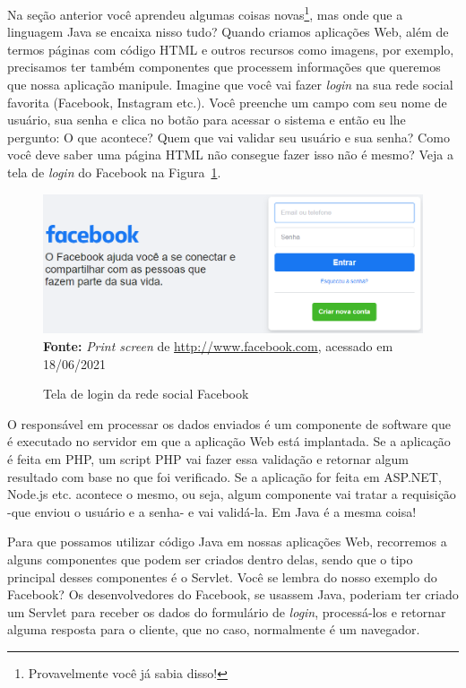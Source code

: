 Na seção anterior você aprendeu algumas coisas novas\footnote{Provavelmente você já sabia disso!}, mas onde que a linguagem Java se encaixa nisso tudo? Quando criamos aplicações Web, além de termos páginas com código HTML e outros recursos como imagens, por exemplo, precisamos ter também componentes que processem informações que queremos que nossa aplicação manipule. Imagine que você vai fazer \textit{login} na sua rede social favorita (Facebook, Instagram etc.). Você preenche um campo com seu nome de usuário, sua senha e clica no botão para acessar o sistema e então eu lhe pergunto: O que acontece? Quem que vai validar seu usuário e sua senha? Como você deve saber uma página HTML não consegue fazer isso não é mesmo? Veja a tela de \textit{login} do Facebook na Figura~\ref{fig:cap01LoginFacebook}.

\FloatBarrier
\begin{figure}[!htbp]
    \centering
    \caption{Tela de login da rede social Facebook}
    \includegraphics[scale=0.38]{imagens/cap01LoginFacebook}
    \\\textbf{Fonte:} \textit{Print screen} de \url{http://www.facebook.com}, acessado em 18/06/2021
    \label{fig:cap01LoginFacebook}
\end{figure}
\FloatBarrier

O responsável em processar os dados enviados é um componente de software que é executado no servidor em que a aplicação Web está implantada. Se a aplicação é feita em PHP, um script PHP vai fazer essa validação e retornar algum resultado com base no que foi verificado. Se a aplicação for feita em ASP.NET, Node.js etc. acontece o mesmo, ou seja, algum componente vai tratar a requisição -que enviou o usuário e a senha- e vai validá-la. Em Java é a mesma coisa!

Para que possamos utilizar código Java em nossas aplicações Web, recorremos a alguns componentes que podem ser criados dentro delas, sendo que o tipo principal desses componentes é o Servlet. Você se lembra do nosso exemplo do Facebook? Os desenvolvedores do Facebook, se usassem Java, poderiam ter criado um Servlet para receber os dados do formulário de \textit{login}, processá-los e retornar alguma resposta para o cliente, que no caso, normalmente é um navegador.

